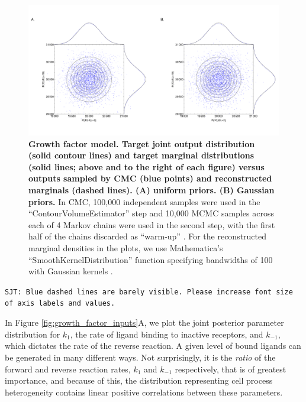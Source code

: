 \begin{figure}[H]
	\centerline{\includegraphics[width=\textwidth]{../figures/growth_factor_outputs.pdf}}
	\caption{\textbf{Growth factor model. Target joint output distribution (solid contour lines) and target marginal distributions (solid lines; above and to the right of each figure) versus outputs sampled by CMC (blue points) and reconstructed marginals (dashed lines). (A) uniform priors. (B) Gaussian priors.} In CMC, 100,000 independent samples were used in the ``ContourVolumeEstimator'' step and 10,000 MCMC samples across each of 4 Markov chains were used in the second step, with the first half of the chains discarded as ``warm-up'' \cite{lambert2018Student}. For the reconstructed marginal densities in the plots, we use Mathematica's ``SmoothKernelDistribution'' function specifying bandwidths of 100 with Gaussian kernels \cite{mathematica}.}
	\label{fig:growth_factor_outputs}
\end{figure}

{\tt SJT: Blue dashed lines are barely visible. Please increase font size of axis labels and values.}

In Figure \ref{fig:growth_factor_inputs}A, we plot the joint posterior parameter distribution for $k_1$, the rate of ligand binding to inactive receptors, and $k_{-1}$, which dictates the rate of the reverse reaction. %
A given level of bound ligands can be generated in many different ways. Not surprisingly, it is the \emph{ratio} of the forward and reverse reaction rates, $k_1$ and $k_{-1}$ respectively, that is of greatest importance, and because of this, the distribution representing cell process heterogeneity contains linear positive correlations between these parameters.



